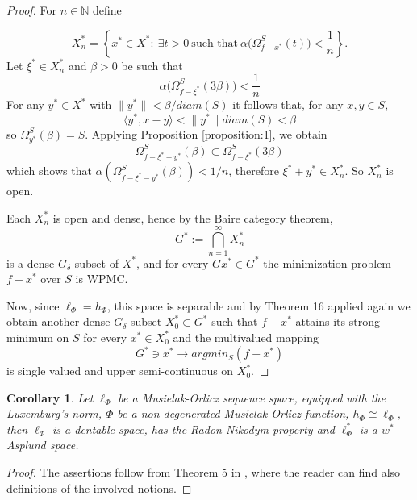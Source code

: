 \documentclass[12pt]{article}
\theoremstyle{thmstyleone}%
\newtheorem{cor}[theorem]{Corollary}%
\theoremstyle{thmstyletwo}%
\theoremstyle{thmstylethree}%
\begin{document}
{{\begin{proof}
For $n\in\mathbb{N}$ define


\[
X_n^*
=
\left\{
x^*\in X^*:\ \exists t>0\ \text{such that}\ 
\alpha	\big(\Omega^S_{f-x^*}(t)\big)<\frac{1}{n}
\right\}.
\]
Let $\xi^*\in X_n^*$ and $\beta>0$ be such that 
$$
\alpha	\big(\Omega^S_{f-\xi^*}(3\beta)\big)<\frac{1}{n}
$$
For any $y^*\in X^*$ with $\|y^*\|<\beta/diam(S)$ it follows that, for any $x, y\in S$,
$$
\langle y^*,x-y\rangle < \|y^*\|diam (S) < \beta
$$
so $\Omega^S_{y^*}(\beta)=S$. Applying Proposition \ref{proposition:1}, we obtain
$$
\Omega^S_{f-\xi^*-y^*}(\beta) \subset \Omega^S_{f-\xi^*}(3\beta)
$$
which shows that $\alpha(\Omega^S_{f-\xi^*-y^*}(\beta)) < 1/n$, therefore $\xi^*+y^*\in X_n^*$. So $X^*_n$ is open.


Each $X_n^*$ is open and dense, hence by the Baire category theorem,
\[
G^*:=\bigcap_{n=1}^\infty X_n^*
\]
is a dense $G_\delta$ subset of $X^*$, and for every $Gx^*\in G^*$ the minimization problem $f-x^*$ over $S$ is WPMC.

Now, since $\ell_\Phi=h_\Phi$, this space is separable and  by Theorem 16 applied again we obtain another dense $G_\delta$ subset $X^*_0\subset G^*$ such that $f-x^*$ attains its strong minimum on $S$ for every $x^*\in X^*_0$ and the multivalued mapping 
$$
G^*\ni x^* \rightarrow argmin_S (f-x^*)
$$
 is single valued and upper semi-continuous on $X^*_0$. 
\end{proof}

}

\begin{cor} \label{corollary:15}
	Let $\ell_{\Phi}$ be a Musielak-Orlicz sequence space, equipped with the Luxemburg's norm,  $\Phi$ be a non-degenerated Musielak-Orlicz function, $h_\Phi\cong \ell_\Phi$, then $\ell_\Phi$ is a dentable space, has the Radon-Nikodym property and $\ell_\Phi^*$ is a $w^*$-Asplund space.
\end{cor}
\begin{proof}
	The assertions follow from Theorem 5 in \cite{Lassonde}, where the reader can find also definitions of the involved notions.
\end{proof}


}
\end{document}
